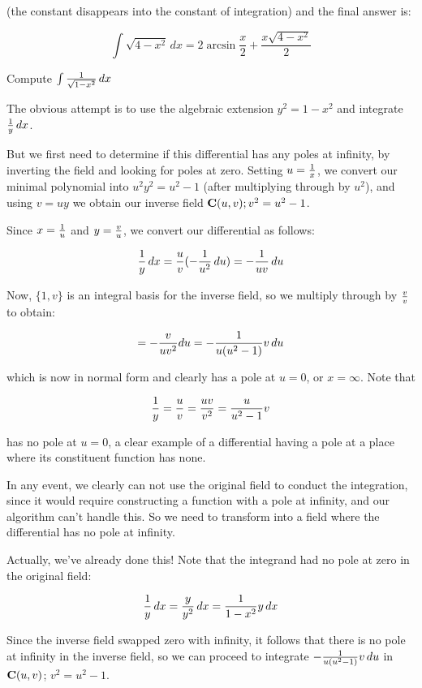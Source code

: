 (the constant disappears into the constant of integration) and the final answer is:

$$ \int \sqrt{4-x^2} \, dx  = 2\arcsin\frac{x}{2} + \frac{x \sqrt{4-x^2}}{2}$$

\endexample


\vfill\eject
{}

\example Compute $\int {1\over{\sqrt{1-x^2}}} \,dx$

The obvious attempt is to use the algebraic extension $y^2=1-x^2$ and
integrate ${1\over y}\,dx$.

But we first need to determine if this differential has any poles at
infinity, by inverting the field and looking for poles at zero.
Setting $u={1\over x}$, we convert our minimal polynomial into
$u^2y^2=u^2-1$ (after multiplying through by $u^2$), and using
$v=uy$ we obtain our inverse field ${\bf C}(u,v); v^2=u^2-1$.

Since $x={1\over u}$ and $y={v\over u}$, we convert our differential as follows:

 $${1\over y}\,dx ={u\over v} (-{1\over{u^2}} \, du) = -{1\over{uv}} \, du$$

Now, $\{1, v\}$ is an integral basis for the inverse field, so we
multiply through by $v\over v$ to obtain:

 $$= -{v\over{uv^2}} du = -{1\over{u(u^2-1)}}v \, du $$

which is now in normal form and clearly has a pole at $u=0$, or $x=\infty$.  Note that

 $${1\over y} = {u\over v} = {{uv}\over{v^2}}
 = {u\over{u^2-1}} v$$

has no pole at $u=0$, a clear example of a differential having a pole
at a place where its constituent function has none.

In any event, we clearly can not use the original field to conduct the
integration, since it would require constructing a function with a
pole at infinity, and our algorithm can't handle this.  So we need to
transform into a field where the differential has no pole at infinity.

Actually, we've already done this!  Note that the integrand had no pole
at zero in the original field:

 $${1\over y}\,dx = {y\over y^2}\,dx = {1\over{1-x^2}}y \,dx $$

Since the inverse field swapped zero with infinity, it follows that
there is no pole at infinity in the inverse field, so we can proceed
to integrate $-{1\over{u(u^2-1)}}v \,du$ in ${\bf C}(u,v)$;
$v^2=u^2-1$.

